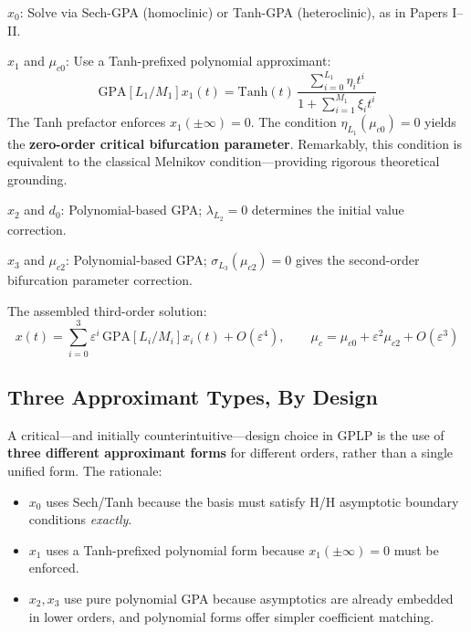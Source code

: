 \documentclass[11pt,a4paper]{article}
\begin{document}
\begin{description}[leftmargin=2em]
\item[Step I] $x_0$: Solve via Sech-GPA (homoclinic) or Tanh-GPA (heteroclinic), as in Papers I--II.
\item[Step II] $x_1$ and $\mu_{c0}$: Use a Tanh-prefixed polynomial approximant:
\begin{equation}
\text{GPA}[L_1/M_1]x_1(t) = \text{Tanh}(t)\,\frac{\sum_{i=0}^{L_1} \eta_i t^i}{1 + \sum_{i=1}^{M_1} \xi_i t^i}
\label{eq:x1_gplp}
\end{equation}
The Tanh prefactor enforces $x_1(\pm\infty)=0$. The condition $\eta_{L_1}(\mu_{c0}) = 0$ yields the \textbf{zero-order critical bifurcation parameter}. Remarkably, this condition is equivalent to the classical Melnikov condition---providing rigorous theoretical grounding.

\item[Step III] $x_2$ and $d_0$: Polynomial-based GPA; $\lambda_{L_2}=0$ determines the initial value correction.

\item[Step IV] $x_3$ and $\mu_{c2}$: Polynomial-based GPA; $\sigma_{L_3}(\mu_{c2}) = 0$ gives the second-order bifurcation parameter correction.
\end{description}

The assembled third-order solution:
\begin{equation}
\boxed{x(t) = \sum_{i=0}^{3} \varepsilon^i \, \text{GPA}[L_i/M_i]x_i(t) + O(\varepsilon^4)}, \qquad
\boxed{\mu_c = \mu_{c0} + \varepsilon^2\mu_{c2} + O(\varepsilon^3)}
\label{eq:final_gplp}
\end{equation}

\subsection{Three Approximant Types, By Design}

A critical---and initially counterintuitive---design choice in GPLP is the use of \textbf{three different approximant forms} for different orders, rather than a single unified form. The rationale:

\begin{itemize}[leftmargin=2em]
\item $x_0$ uses Sech/Tanh because the basis must satisfy H/H asymptotic boundary conditions \emph{exactly}.
\item $x_1$ uses a Tanh-prefixed polynomial form because $x_1(\pm\infty) = 0$ must be enforced.
\item $x_2, x_3$ use pure polynomial GPA because asymptotics are already embedded in lower orders, and polynomial forms offer simpler coefficient matching.
\end{itemize}
\end{document}
